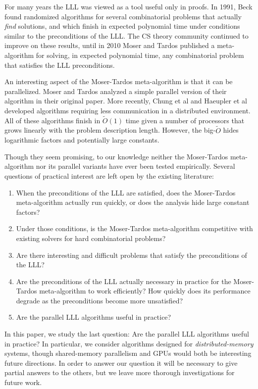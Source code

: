 \documentclass{article}
\begin{document}
For many years the LLL was viewed as a tool useful only in proofs.  In 1991, Beck \cite{beck1991algorithmic} found randomized algorithms for several combinatorial problems that actually \emph{find} solutions, and which finish in expected polynomial time under conditions similar to the preconditions of the LLL.  The CS theory community continued to improve on these results, until in 2010 Moser and Tardos \cite{moser2010constructive} published a meta-algorithm for solving, in expected polynomial time, any combinatorial problem that satisfies the LLL preconditions.

An interesting aspect of the Moser-Tardos meta-algorithm is that it can be parallelized.  Moser and Tardos analyzed a simple parallel version of their algorithm in their original paper.  More recently, Chung et al \cite{chung2014distributed} and Haeupler et al \cite{haeupler2011new} developed algorithms requiring less communication in a distributed environment.  All of these algorithms finish in $\tilde{O}(1)$ time given a number of processors that grows linearly with the problem description length.  However, the big-$\tilde{O}$ hides logarithmic factors and potentially large constants.

Though they seem promising, to our knowledge neither the Moser-Tardos meta-algorithm nor its parallel variants have ever been tested empirically.  Several questions of practical interest are left open by the existing literature:
\begin{enumerate}
  \item When the preconditions of the LLL are satisfied, does the Moser-Tardos meta-algorithm actually run quickly, or does the analysis hide large constant factors?
  \item Under those conditions, is the Moser-Tardos meta-algorithm competitive with existing solvers for hard combinatorial problems?
  \item Are there interesting and difficult problems that satisfy the preconditions of the LLL?
  \item Are the preconditions of the LLL actually necessary in practice for the Moser-Tardos meta-algorithm to work efficiently?  How quickly does its performance degrade as the preconditions become more unsatisfied?
  \item Are the parallel LLL algorithms useful in practice?
\end{enumerate}

In this paper, we study the last question: Are the parallel LLL algorithms useful in practice?  In particular, we consider algorithms designed for \emph{distributed-memory} systems, though shared-memory parallelism and GPUs would both be interesting future directions.  In order to answer our question it will be necessary to give partial answers to the others, but we leave more thorough investigations for future work.
\end{document}
